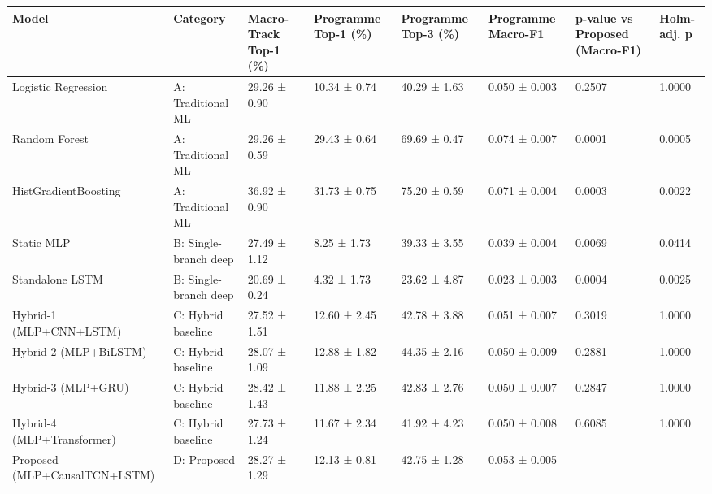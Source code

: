 \begin{tabular}{llllllll}
\toprule
Model & Category & Macro-Track Top-1 (\%) & Programme Top-1 (\%) & Programme Top-3 (\%) & Programme Macro-F1 & p-value vs Proposed (Macro-F1) & Holm-adj. p \\
\midrule
Logistic Regression & A: Traditional ML & 29.26 ± 0.90 & 10.34 ± 0.74 & 40.29 ± 1.63 & 0.050 ± 0.003 & 0.2507 & 1.0000 \\
Random Forest & A: Traditional ML & 29.26 ± 0.59 & 29.43 ± 0.64 & 69.69 ± 0.47 & 0.074 ± 0.007 & 0.0001 & 0.0005 \\
HistGradientBoosting & A: Traditional ML & 36.92 ± 0.90 & 31.73 ± 0.75 & 75.20 ± 0.59 & 0.071 ± 0.004 & 0.0003 & 0.0022 \\
Static MLP & B: Single-branch deep & 27.49 ± 1.12 & 8.25 ± 1.73 & 39.33 ± 3.55 & 0.039 ± 0.004 & 0.0069 & 0.0414 \\
Standalone LSTM & B: Single-branch deep & 20.69 ± 0.24 & 4.32 ± 1.73 & 23.62 ± 4.87 & 0.023 ± 0.003 & 0.0004 & 0.0025 \\
Hybrid-1 (MLP+CNN+LSTM) & C: Hybrid baseline & 27.52 ± 1.51 & 12.60 ± 2.45 & 42.78 ± 3.88 & 0.051 ± 0.007 & 0.3019 & 1.0000 \\
Hybrid-2 (MLP+BiLSTM) & C: Hybrid baseline & 28.07 ± 1.09 & 12.88 ± 1.82 & 44.35 ± 2.16 & 0.050 ± 0.009 & 0.2881 & 1.0000 \\
Hybrid-3 (MLP+GRU) & C: Hybrid baseline & 28.42 ± 1.43 & 11.88 ± 2.25 & 42.83 ± 2.76 & 0.050 ± 0.007 & 0.2847 & 1.0000 \\
Hybrid-4 (MLP+Transformer) & C: Hybrid baseline & 27.73 ± 1.24 & 11.67 ± 2.34 & 41.92 ± 4.23 & 0.050 ± 0.008 & 0.6085 & 1.0000 \\
Proposed (MLP+CausalTCN+LSTM) & D: Proposed & 28.27 ± 1.29 & 12.13 ± 0.81 & 42.75 ± 1.28 & 0.053 ± 0.005 & - & - \\
\bottomrule
\end{tabular}
